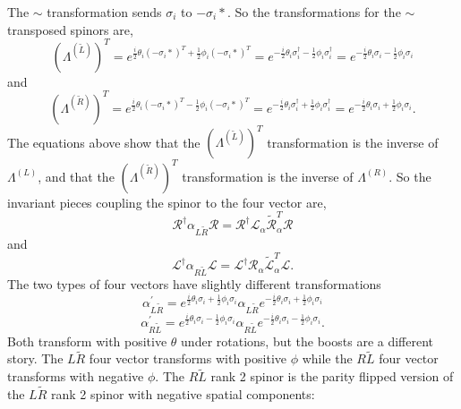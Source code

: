 The $\sim$ transformation sends $\sigma_i$ to $-\sigma_i*$. So the transformations for the $\sim$ transposed spinors are,
\begin{equation}
(\Lambda^{(\tilde{L})})^T = e^{\frac{i}{2}\theta_i(-\sigma_i*)^T + \frac{1}{2}\phi_i (-\sigma_i*)^T} 
= e^{-\frac{i}{2}\theta_i \sigma_i^\dagger - \frac{1}{2}\phi_i \sigma_i^\dagger} = e^{-\frac{i}{2}\theta_i \sigma_i - \frac{1}{2}\phi_i \sigma_i}
\end{equation}
and
\begin{equation}
(\Lambda^{(\tilde{R})})^T = e^{\frac{i}{2}\theta_i(-\sigma_i*)^T - \frac{1}{2}\phi_i (-\sigma_i*)^T} 
= e^{-\frac{i}{2}\theta_i \sigma_i^\dagger + \frac{1}{2}\phi_i \sigma_i^\dagger} = e^{-\frac{i}{2}\theta_i \sigma_i + \frac{1}{2}\phi_i \sigma_i}.
\end{equation}
The equations above show that the $(\Lambda^{(\tilde{L})})^T$ transformation is the inverse of $\Lambda^{(L)}$, and that the $(\Lambda^{(\tilde{R})})^T$ transformation is the inverse of $\Lambda^{(R)}$. So the invariant pieces coupling the spinor to the four vector are,
\begin{equation}
\mathcal{R}^\dagger \alpha_{L\tilde{R}} \mathcal{R} = \mathcal{R}^\dagger \mathcal{L}_\alpha \tilde{\mathcal{R}}_\alpha^{T} \mathcal{R}
\end{equation}
and
\begin{equation}
\mathcal{L}^\dagger \alpha_{R\tilde{L}} \mathcal{L} = \mathcal{L}^\dagger \mathcal{R}_\alpha \tilde{\mathcal{L}}_\alpha^{T} \mathcal{L}.
\end{equation}
The two types of four vectors have slightly different transformations
\begin{equation}
\alpha_{L\tilde{R}}^{'} = e^{\frac{i}{2}\theta_i \sigma_i + \frac{1}{2}\phi_i \sigma_i} 
\alpha_{L\tilde{R}} e^{-\frac{i}{2}\theta_i \sigma_i + \frac{1}{2}\phi_i \sigma_i}
\end{equation}
\begin{equation}
\alpha_{R\tilde{L}}^{'} = e^{\frac{i}{2}\theta_i \sigma_i - \frac{1}{2}\phi_i \sigma_i} 
\alpha_{R\tilde{L}} e^{-\frac{i}{2}\theta_i \sigma_i - \frac{1}{2}\phi_i \sigma_i}.
\end{equation}
Both transform with positive $\theta$ under rotations, but the boosts are a different story. The $L\tilde{R}$ four vector transforms with positive $\phi$ while the $R\tilde{L}$ four vector transforms with negative $\phi$. The $R\tilde{L}$ rank 2 spinor is the parity flipped version of the $L\tilde{R}$ rank 2 spinor with negative spatial components:  
